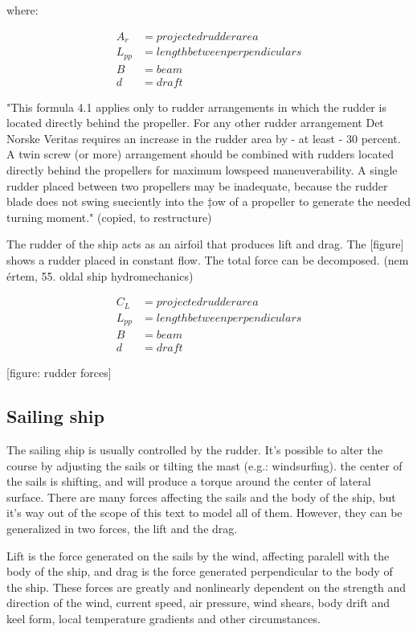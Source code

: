 where:

\begin{align}
	A_r &= projected rudder area \\
	L_{pp} &= length between perpendiculars \\
	B &= beam \\
	d &= draft
\end{align}

"This formula 4.1 applies only to rudder arrangements in which the rudder is located directly
behind the propeller. For any other rudder arrangement Det Norske Veritas requires an
increase in the rudder area by - at least - 30 percent. A twin screw (or more) arrangement
should be combined with rudders located directly behind the propellers for maximum lowspeed
maneuverability. A single rudder placed between two propellers may be inadequate,
because the rudder blade does not swing su¢ciently into the ‡ow of a propeller to generate
the needed turning moment." (copied, to restructure)

The rudder of the ship acts as an airfoil that produces lift and drag. The [figure] shows a rudder placed in constant flow. The total force can be decomposed. (nem értem, 55. oldal ship hydromechanics)

\begin{align}
	C_L &= projected rudder area \\
	L_{pp} &= length between perpendiculars \\
	B &= beam \\
	d &= draft
\end{align}

[figure: rudder forces]

\subsection{Sailing ship}

The sailing ship is usually controlled by the rudder. It’s possible to alter the course by adjusting the sails or tilting the mast (e.g.: windsurfing). the center of the sails is shifting, and will produce a torque around the center of lateral surface.
There are many forces affecting the sails and the body of the ship, but it’s way out of the scope of this text to model all of them. However, they can be generalized in two forces, the lift and the drag.

Lift is the force generated on the sails by the wind, affecting paralell with the body of the ship, and drag is the force generated perpendicular to the body of the ship. These forces are greatly and nonlinearly dependent on the strength and direction of the wind, current speed, air pressure, wind shears, body drift and keel form, local temperature gradients and other circumstances.

